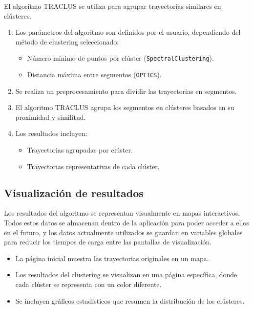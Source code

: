 El algoritmo TRACLUS se utiliza para agrupar trayectorias similares en clústeres.

\begin{enumerate}
    \item Los parámetros del algoritmo son definidos por el usuario, dependiendo del método de clustering seleccionado:
    \begin{itemize}
        \item Número mínimo de puntos por clúster (\texttt{SpectralClustering}).
        \item Distancia máxima entre segmentos (\texttt{OPTICS}).
    \end{itemize}
    \item Se realiza un preprocesamiento para dividir las trayectorias en segmentos.
    \item El algoritmo TRACLUS agrupa los segmentos en clústeres basados en su proximidad y similitud.
    \item Los resultados incluyen:
    \begin{itemize}
        \item Trayectorias agrupadas por clúster.
        \item Trayectorias representativas de cada clúster.
    \end{itemize}
\end{enumerate}

\subsection{Visualización de resultados}

Los resultados del algoritmo se representan visualmente en mapas interactivos. Todos estos datos se almacenan dentro de la aplicación para poder acceder a ellos en el futuro, y los datos actualmente utilizados se guardan en variables globales para reducir los tiempos de carga entre las pantallas de visualización.

\begin{itemize}
    \item La página inicial muestra las trayectorias originales en un mapa.
    \item Los resultados del clustering se visualizan en una página específica, donde cada clúster se representa con un color diferente.
    \item Se incluyen gráficos estadísticos que resumen la distribución de los clústeres.
\end{itemize}

